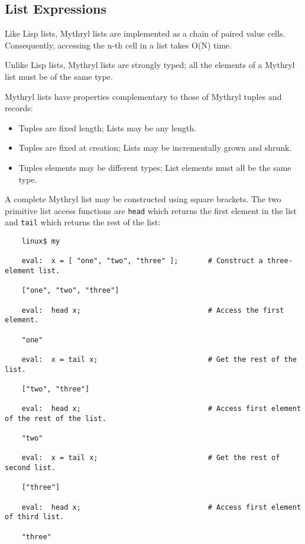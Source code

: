 \subsection{List Expressions}
\label{section:ref:expressions:list-expressions}

Like Lisp lists, Mythryl lists are implemented as a chain 
of paired value cells.  Consequently, accessing the n-th 
cell in a list takes O(N) time.

Unlike Lisp lists, Mythryl lists are strongly typed; all the elements 
of a Mythryl list must be of the same type.

Mythryl lists have properties complementary to those of 
Mythryl tuples and records:

\begin{itemize}
\item Tuples are fixed length; Lists may be any length.
\item Tuples are fixed at creation;  Lists may be incrementally grown and shrunk.
\item Tuples elements may be different types; List elements must all be the same type.
\end{itemize}

A complete Mythryl list may be constructed using square brackets.  The two 
primitive list access functions are {\tt head} which returns the first 
element in the list and {\tt tail} which returns the rest of the list:

\begin{verbatim}
    linux$ my

    eval:  x = [ "one", "two", "three" ];       # Construct a three-element list.

    ["one", "two", "three"]

    eval:  head x;                              # Access the first element.

    "one"

    eval:  x = tail x;                          # Get the rest of the list.

    ["two", "three"]

    eval:  head x;                              # Access first element of the rest of the list.

    "two"

    eval:  x = tail x;                          # Get the rest of second list.

    ["three"]

    eval:  head x;                              # Access first element of third list.

    "three"
\end{verbatim}


